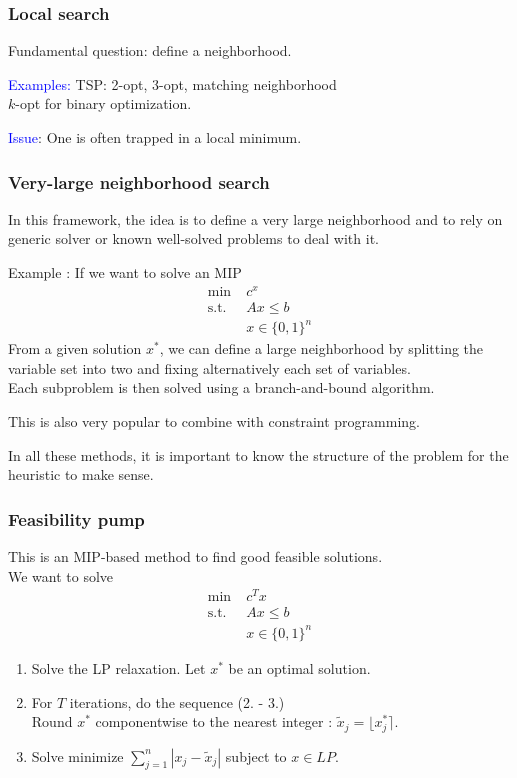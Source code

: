 \documentclass[9pt,handout]{beamer}
\begin{document}
\begin{frame}
\frametitle{Local search}
Fundamental question: define a \alert{neighborhood}.\bigskip

\textcolor{blue}{Examples:} TSP: 2-opt, 3-opt, matching neighborhood\\
$k$-opt for binary optimization.\bigskip

\textcolor{blue}{Issue}: One is often trapped in a local minimum.
\end{frame}
\begin{frame}
\frametitle{Very-large neighborhood search}
In this framework, the idea is to define a \alert{very large neighborhood}
and to rely on generic solver or known well-solved problems to deal with it.\bigskip

\alert{Example} : If we want to solve an MIP
\begin{align*}
\min \;& c^x\\
\text{s.t. }\;& Ax\leq b\\
& x\in \{0,1\}^n
\end{align*}
From a given solution $x^*$, we can define a large neighborhood 
by splitting the variable set into two and \alert{fixing alternatively} each set of variables.\\
Each subproblem is then solved using a branch-and-bound algorithm.\bigskip

This is also very popular to combine with \alert{constraint programming}.\bigskip

In all these methods, it is important to know the \alert{structure} of the problem 
for the heuristic to make sense.
\end{frame}
\begin{frame}
\frametitle{Feasibility pump}
This is an MIP-based method to find good \alert{feasible solutions}.\\
We want to solve \begin{align*}
\min \;& c^Tx\\
\text{s.t. }\;& Ax\leq b\\
& x\in \{0,1\}^n
\end{align*}
\begin{enumerate}[1.]
\item Solve the LP relaxation.
Let $x^*$ be an optimal solution.\medskip
\item For $T$ iterations, do the sequence (2. - 3.)\\
Round $x^*$ componentwise to the nearest integer : $\tilde x_j = \lfloor x_j^* \rceil.$\medskip
\item Solve  minimize $\sum_{j=1}^n |x_j-\tilde x_j|$ subject to $x\in LP.$
\end{enumerate}
\end{frame}
\end{document}
